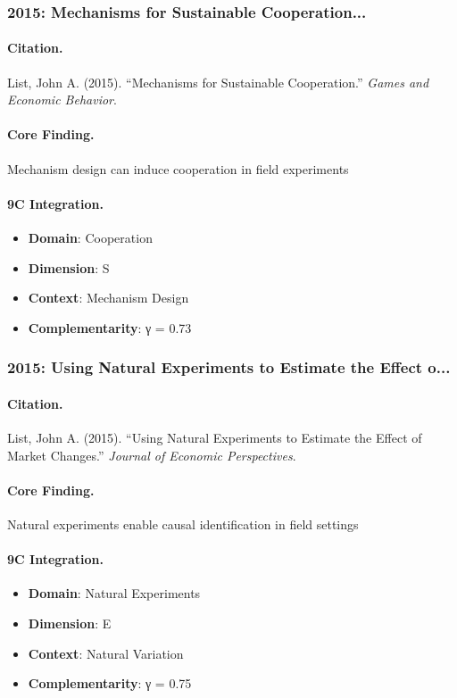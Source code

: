 \subsubsection{2015: Mechanisms for Sustainable Cooperation...}

\paragraph{Citation.}
List, John A. (2015). ``Mechanisms for Sustainable Cooperation.''
\textit{Games and Economic Behavior}.

\paragraph{Core Finding.}
Mechanism design can induce cooperation in field experiments

\paragraph{9C Integration.}
\begin{itemize}[nosep]
  \item \textbf{Domain}: Cooperation
  \item \textbf{Dimension}: S
  \item \textbf{Context}: Mechanism Design
  \item \textbf{Complementarity}: γ = 0.73
\end{itemize}


\subsubsection{2015: Using Natural Experiments to Estimate the Effect o...}

\paragraph{Citation.}
List, John A. (2015). ``Using Natural Experiments to Estimate the Effect of Market Changes.''
\textit{Journal of Economic Perspectives}.

\paragraph{Core Finding.}
Natural experiments enable causal identification in field settings

\paragraph{9C Integration.}
\begin{itemize}[nosep]
  \item \textbf{Domain}: Natural Experiments
  \item \textbf{Dimension}: E
  \item \textbf{Context}: Natural Variation
  \item \textbf{Complementarity}: γ = 0.75
\end{itemize}


